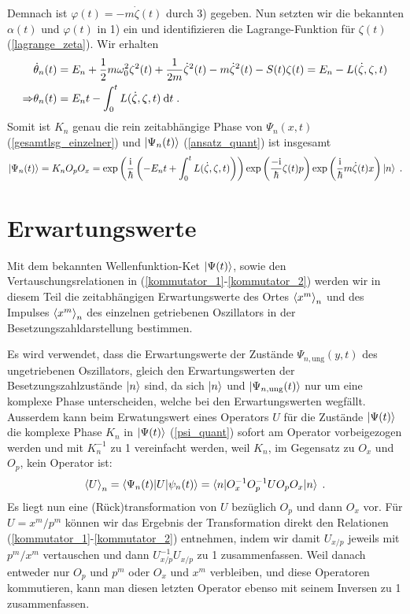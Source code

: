   Demnach ist $\varphi(t)=-m\dot\zeta(t)$ durch 3) gegeben.
  Nun setzten wir die bekannten $\alpha(t)$ und $\varphi(t)$ in 1) ein und identifizieren die Lagrange-Funktion für $\zeta(t)$ (\ref{lagrange_zeta}). Wir erhalten
  \begin{align}
    &\dot\theta_n(t)=E_n+\frac{1}{2}m\omega_0^2\zeta^2(t)+\frac{1}{2m}\dot\zeta^2(t)-m\dot\zeta^2(t)-S(t)\zeta(t)
    =E_n-L(\dot\zeta,\zeta,t) \notag\\
    \Rightarrow &\theta_n(t)=E_nt-\int_0^tL(\dot\zeta,\zeta,t)\:\text dt \;.
  \end{align}
  Somit ist $K_n$ genau die rein zeitabhängige Phase von $\Psi_n(x,t)$ (\ref{gesamtlsg_einzelner}) und $\ket{\Psi_n(t)}$ (\ref{ansatz_quant}) ist insgesamt
  \begin{equation}
    \ket{\Psi_n(t)}=K_nO_pO_x=\exp\left(\frac{\text i}{\hbar}\left(-E_nt+\int_0^tL(\dot\zeta,\zeta,t)\right)\right)\exp\left(\frac{-\text i}{\hbar}\zeta(t)p\right)\exp\left(\frac{\text i}{\hbar}m\dot\zeta(t)x\right)\ket{n} \; .
    \label{psi_quant}
  \end{equation}



\section{Erwartungswerte}
  Mit dem bekannten Wellenfunktion-Ket $\ket{\Psi(t)}$, sowie den Vertauschungsrelationen in (\ref{kommutator_1}-\ref{kommutator_2}) werden wir in diesem Teil die zeitabhängigen Erwartungswerte des Ortes $\braket{x^m}_n$ und des Impulses $\braket{x^m}_n$ des einzelnen getriebenen Oszillators in der Besetzungszahldarstellung bestimmen.

  Es wird verwendet, dass die Erwartungswerte der Zustände $\Psi_{n,\text{ung}}(y,t)$ des ungetriebenen Oszillators, gleich den Erwartungswerten der Besetzungszahlzustände $\ket{n}$ sind, da sich $\ket{n}$ und $\ket{\Psi_{n,\text{ung}}(t)}$ nur um eine komplexe Phase unterscheiden, welche bei den Erwartungswerten wegfällt.
  Ausserdem kann beim Erwatungswert eines Operators $U$ für die Zustände $\ket{\Psi(t)}$ die komplexe Phase $K_n$ in $\ket{\Psi(t)}$ (\ref{psi_quant}) sofort am Operator vorbeigezogen werden und mit $K_n^{-1}$ zu 1 vereinfacht werden, weil $K_n$, im Gegensatz zu $O_x$ und $O_p$, kein Operator ist:
  \begin{equation}
    \braket{U}_n=\braket{\Psi_n(t)|U|\psi_n(t)}=\braket{n|O_x^{-1}O_p^{-1}UO_pO_x|n} \;.
  \end{equation}
  Es liegt nun eine (Rück)transformation von $U$ bezüglich $O_p$ und dann $O_x$ vor.
  Für $U=x^m/p^m$ können wir das Ergebnis der Transformation direkt den Relationen (\ref{kommutator_1}-\ref{kommutator_2}) entnehmen, indem wir damit $U_{x/p}$ jeweils mit $p^m/x^m$ vertauschen und dann $U_{x/p}^{-1}U_{x/p}$ zu 1 zusammenfassen.
  Weil danach entweder nur $O_p$ und $p^m$ oder $O_x$ und $x^m$ verbleiben, und diese Operatoren kommutieren, kann man diesen letzten Operator ebenso mit seinem Inversen zu 1 zusammenfassen.

